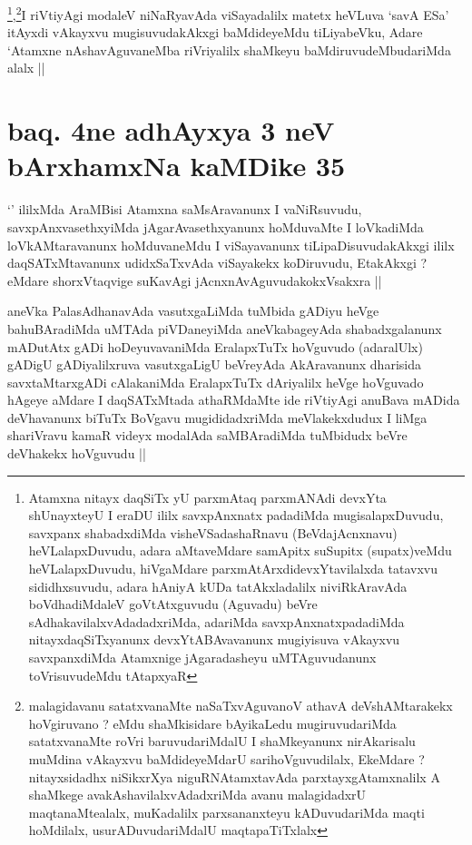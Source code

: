 \begin{artha}
\footnote[1]{Atamxna nitayx daqSiTx yU parxmAtaq parxmANAdi devxYta
  shUnayxteyU I eraDU ililx savxpAnxnatx padadiMda mugisalapxDuvudu,
  savxpanx shabadxdiMda visheVSadashaRnavu (BeVdajAcnxnavu)
  heVLalapxDuvudu, adara aMtaveMdare samApitx suSupitx (supatx)veMdu
  heVLalapxDuvudu, hiVgaMdare parxmAtArxdidevxYtavilalxda tatavxvu
  sididhxsuvudu, adara hAniyA kUDa tatAkxladalilx niviRkAravAda
  boVdhadiMdaleV goVtAtxguvudu (Aguvadu) beVre
  sAdhakavilalxvAdadadxriMda, adariMda savxpAnxnatxpadadiMda
  nitayxdaqSiTxyanunx devxYtABAvavanunx mugiyisuva vAkayxvu
  savxpanxdiMda Atamxnige jAgaradasheyu uMTAguvudanunx toVrisuvudeMdu
  tAtapxyaR},\footnote[2]{malagidavanu satatxvanaMte naSaTxvAguvanoV
  athavA deVshAMtarakekx hoVgiruvano ? eMdu shaMkisidare bAyikaLedu
  mugiruvudariMda satatxvanaMte roVri baruvudariMdalU I shaMkeyanunx
  nirAkarisalu muMdina vAkayxvu baMdideyeMdarU sarihoVguvudilalx,
  EkeMdare ?  nitayxsidadhx niSikxrXya niguRNAtamxtavAda
  parxtayxgAtamxnalilx A shaMkege avakAshavilalxvAdadxriMda avanu
  malagidadxrU maqtanaMtealalx, muKadalilx parxsananxteyu
  kADuvudariMda maqti hoMdilalx, usurADuvudariMdalU maqtapaTiTxlalx
}I riVtiyAgi modaleV niNaRyavAda
viSayadalilx matetx heVLuva `savA ESa' itAyxdi vAkayxvu
mugisuvudakAkxgi baMdideyeMdu tiLiyabeVku, Adare `Atamxne
nAshavAguvaneMba riVriyalilx shaMkeyu baMdiruvudeMbudariMda alalx ||
\end{artha}

\section*{baq. 4ne adhAyxya 3 neV bArxhamxNa kaMDike 35}

\stext


\begin{artha}
`\stext' ililxMda AraMBisi Atamxna saMsAravanunx I vaNiRsuvudu,
  savxpAnxvasethxyiMda jAgarAvasethxyanunx hoMduvaMte I loVkadiMda
  loVkAMtaravanunx hoMduvaneMdu I viSayavanunx tiLipaDisuvudakAkxgi
  ililx daqSATxMtavanunx udidxSaTxvAda viSayakekx koDiruvudu,
  EtakAkxgi ? eMdare shorxVtaqvige suKavAgi jAcnxnAvAguvudakokxVsakxra ||
\end{artha}


\begin{artha}
aneVka PalasAdhanavAda vasutxgaLiMda tuMbida gADiyu heVge
bahuBAradiMda uMTAda piVDaneyiMda aneVkabageyAda shabadxgalanunx
mADutAtx gADi hoDeyuvavaniMda EralapxTuTx hoVguvudo (adaralUlx) gADigU
gADiyalilxruva vasutxgaLigU beVreyAda AkAravanunx dharisida
savxtaMtarxgADi cAlakaniMda EralapxTuTx dAriyalilx heVge hoVguvado
hAgeye aMdare I daqSATxMtada athaRMdaMte ide riVtiyAgi anuBava mADida
deVhavanunx biTuTx BoVgavu mugididadxriMda meVlakekxdudux I liMga
shariVravu kamaR videyx modalAda saMBAradiMda tuMbidudx beVre
deVhakekx hoVguvudu ||
\end{artha}

